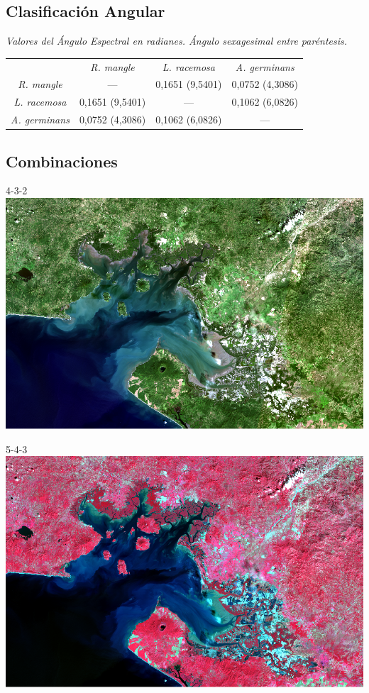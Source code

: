 \documentclass[12pt]{beamer}
\begin{document}
\subsection{Clasificación Angular}
\begin{frame}
	\begin{table}
		\centering
\textit{{\footnotesize Valores del Ángulo Espectral en radianes. Ángulo sexagesimal entre paréntesis.}}
		{\small \begin{tabular}{@{}cccc@{}}
			\toprule[0.4mm]
			& \textit{R. mangle} & \textit{L. racemosa} & \textit{A. germinans} \\
			\textit{R. mangle} & --- & 0,1651 (9,5401) & 0,0752 (4,3086) \\
			\textit{L. racemosa} & 0,1651 (9,5401) & --- & 0,1062 (6,0826) \\
			\textit{A. germinans} & 0,0752 (4,3086) & 0,1062 (6,0826) & --- \\
			\bottomrule[0.4mm]
		\end{tabular}}
	\end{table}
\end{frame}

\subsection{Combinaciones}
\begin{frame}{{\footnotesize 4-3-2}}
	\centering
	\includegraphics[width=0.8\linewidth]{./Imagenes/GF432.png}
\end{frame}

\begin{frame}{{\footnotesize 5-4-3}}
	\centering
	\includegraphics[width=0.8\linewidth]{./Imagenes/GF543.png}
\end{frame}
\end{document}
